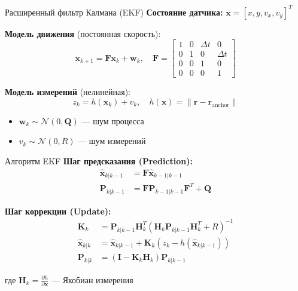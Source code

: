 \documentclass[aspectratio=169, 12pt]{beamer}
\begin{document}
\begin{frame}{Расширенный фильтр Калмана (EKF)}
    \textbf{Состояние датчика:} $\mathbf{x} = [x, y, v_x, v_y]^T$
    
    \vspace{0.3cm}
    \textbf{Модель движения} (постоянная скорость):
    \[
    \mathbf{x}_{k+1} = \mathbf{F} \mathbf{x}_k + \mathbf{w}_k, \quad \mathbf{F} = \begin{bmatrix} 1 & 0 & \Delta t & 0 \\ 0 & 1 & 0 & \Delta t \\ 0 & 0 & 1 & 0 \\ 0 & 0 & 0 & 1 \end{bmatrix}
    \]
    
    \vspace{0.3cm}
    \textbf{Модель измерений} (нелинейная):
    \[
    z_k = h(\mathbf{x}_k) + v_k, \quad h(\mathbf{x}) = \|\mathbf{r} - \mathbf{r}_{\text{anchor}}\|
    \]

    \begin{itemize}
        \item $\mathbf{w}_k \sim \mathcal{N}(0, \mathbf{Q})$ --- шум процесса
        \item $v_k \sim \mathcal{N}(0, R)$ --- шум измерений
    \end{itemize}
\end{frame}

\begin{frame}{Алгоритм EKF}
    \textbf{Шаг предсказания (Prediction):}
    \[
    \begin{aligned}
        \hat{\mathbf{x}}_{k|k-1} &= \mathbf{F} \hat{\mathbf{x}}_{k-1|k-1} \\
        \mathbf{P}_{k|k-1} &= \mathbf{F} \mathbf{P}_{k-1|k-1} \mathbf{F}^T + \mathbf{Q}
    \end{aligned}
    \]
    
    \vspace{0.3cm}
    \textbf{Шаг коррекции (Update):}
    \[
    \begin{aligned}
        \mathbf{K}_k &= \mathbf{P}_{k|k-1} \mathbf{H}_k^T (\mathbf{H}_k \mathbf{P}_{k|k-1} \mathbf{H}_k^T + R)^{-1} \\
        \hat{\mathbf{x}}_{k|k} &= \hat{\mathbf{x}}_{k|k-1} + \mathbf{K}_k (z_k - h(\hat{\mathbf{x}}_{k|k-1})) \\
        \mathbf{P}_{k|k} &= (\mathbf{I} - \mathbf{K}_k \mathbf{H}_k) \mathbf{P}_{k|k-1}
    \end{aligned}
    \]
    
    где $\mathbf{H}_k = \frac{\partial h}{\partial \mathbf{x}}$ --- Якобиан измерения
\end{frame}
\end{document}
